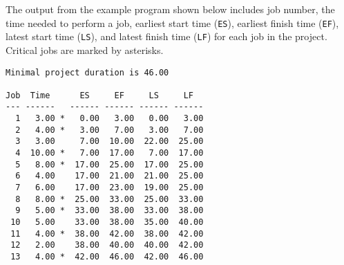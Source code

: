 \documentclass[11pt]{report}
\begin{document}
The output from the example program shown below includes job number,
the time needed to perform a job, earliest start time (\verb|ES|),
earliest finish time (\verb|EF|), latest start time (\verb|LS|), and
latest finish time (\verb|LF|) for each job in the project. Critical
jobs are marked by asterisks.

\begin{footnotesize}
\begin{verbatim}
Minimal project duration is 46.00

Job  Time      ES     EF     LS     LF
--- ------   ------ ------ ------ ------
  1   3.00 *   0.00   3.00   0.00   3.00
  2   4.00 *   3.00   7.00   3.00   7.00
  3   3.00     7.00  10.00  22.00  25.00
  4  10.00 *   7.00  17.00   7.00  17.00
  5   8.00 *  17.00  25.00  17.00  25.00
  6   4.00    17.00  21.00  21.00  25.00
  7   6.00    17.00  23.00  19.00  25.00
  8   8.00 *  25.00  33.00  25.00  33.00
  9   5.00 *  33.00  38.00  33.00  38.00
 10   5.00    33.00  38.00  35.00  40.00
 11   4.00 *  38.00  42.00  38.00  42.00
 12   2.00    38.00  40.00  40.00  42.00
 13   4.00 *  42.00  46.00  42.00  46.00
\end{verbatim}
\end{footnotesize}

\end{document}
